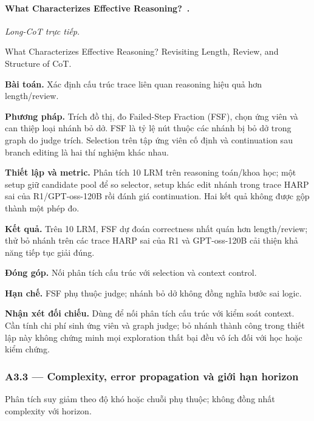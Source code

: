 \begin{samepage}
\paragraph{What Characterizes Effective Reasoning?~\cite{rra3_effective_reasoning}.}
\emph{Long-CoT trực tiếp.}\par
{\raggedright\noindent\small What Characterizes Effective Reasoning? Revisiting Length, Review, and Structure of CoT.\par}
\noindent\textbf{Bài toán.} Xác định cấu trúc trace liên quan reasoning hiệu quả hơn length/review.\par
\end{samepage}
\noindent\textbf{Phương pháp.} Trích đồ thị, đo Failed-Step Fraction (FSF), chọn ứng viên và can thiệp loại nhánh bỏ dở. FSF là tỷ lệ nút thuộc các nhánh bị bỏ dở trong graph do judge trích. Selection trên tập ứng viên cố định và continuation sau branch editing là hai thí nghiệm khác nhau.\par
\noindent\textbf{Thiết lập và metric.} Phân tích 10 LRM trên reasoning toán/khoa học; một setup giữ candidate pool để so selector, setup khác edit nhánh trong trace HARP sai của R1/GPT-oss-120B rồi đánh giá continuation. Hai kết quả không được gộp thành một phép đo.\par
\noindent\textbf{Kết quả.} Trên 10 LRM, FSF dự đoán correctness nhất quán hơn length/review; thử bỏ nhánh trên các trace HARP sai của R1 và GPT-oss-120B cải thiện khả năng tiếp tục giải đúng.\par
\noindent\textbf{Đóng góp.} Nối phân tích cấu trúc với selection và context control.\par
\noindent\textbf{Hạn chế.} FSF phụ thuộc judge; nhánh bỏ dở không đồng nghĩa bước sai logic.\par
\begin{samepage}
\noindent\textbf{Nhận xét đối chiếu.} Dùng để nối phân tích cấu trúc với kiểm soát context. Cần tính chi phí sinh ứng viên và graph judge; bỏ nhánh thành công trong thiết lập này không chứng minh mọi exploration thất bại đều vô ích đối với học hoặc kiểm chứng.\par
{}
\end{samepage}

\subsubsection*{A3.3 — Complexity, error propagation và giới hạn horizon}
Phân tích suy giảm theo độ khó hoặc chuỗi phụ thuộc; không đồng nhất complexity với horizon.

